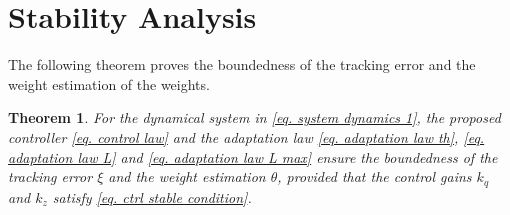 \documentclass[letterpaper, 10 pt, conference]{ieeeconf}  %
\newtheorem{theorem}{Theorem}
\begin{document}
\section{Stability Analysis}\label{sec:stability}

The following theorem proves the boundedness of the tracking error and the weight estimation of the weights.

\begin{theorem}
For the dynamical system in \eqref{eq. system dynamics 1}, the proposed controller \eqref{eq. control law} and the adaptation law \eqref{eq. adaptation law th}, \eqref{eq. adaptation law L} and \eqref{eq. adaptation law L max} ensure the boundedness of the tracking error $\xi$ and the weight estimation $\hat\theta$, provided that the control gains ${k_q}$ and ${k_z}$ satisfy \eqref{eq. ctrl stable condition}.
\end{theorem}
\end{document}
